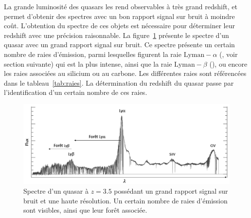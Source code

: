 \documentclass[11pt, twoside, a4paper, openright]{report}
\begin{document}
La grande luminosité des quasars les rend observables à très grand redshift, et permet d'obtenir des spectres avec un bon rapport signal sur bruit à moindre coût. L'obtention du spectre de ces objets est nécessaire pour déterminer leur redshift avec une précision raisonnable. La figure~\ref{fig:spectre_qso} présente le spectre d'un quasar avec un grand rapport signal sur bruit. Ce spectre présente un certain nombre de raies d'émission, parmi lesquelles figurent la raie $\mathrm{Lyman-}\alpha$ (\lya{}, voir section suivante) qui est la plus intense, ainsi que la raie $\mathrm{Lyman-}\beta$ (\lyb{}), ou encore les raies associées au silicium ou au carbone. Les différentes raies sont référencées dans le tableau~\ref{tab:raies}. La détermination du redshift du quasar passe par l'identification d'un certain nombre de ces raies.
\begin{figure}
  \centering
  \includegraphics[scale=0.4]{spectre_qso}
  \caption{Spectre d'un quasar à $z = 3.5$ possédant un grand rapport signal sur bruit et une haute résolution. Un certain nombre de raies d'émission sont visibles, ainsi que leur forêt associée.}
  \label{fig:spectre_qso}
\end{figure}
\end{document}
